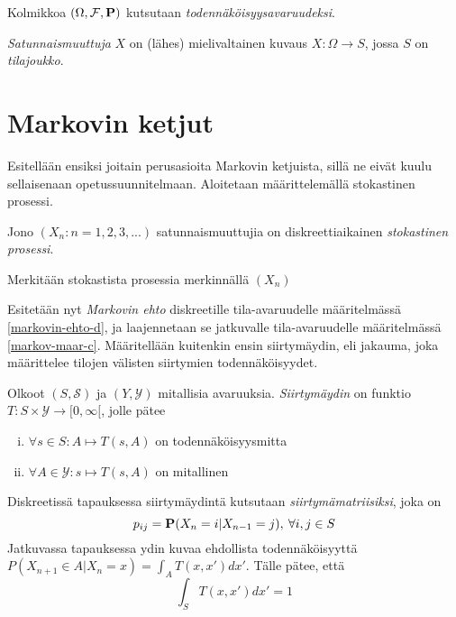\begin{maar}
	Kolmikkoa $(\Omega, \mathcal{F}, \textbf{P} )$ kutsutaan \textit{todennäköisyysavaruudeksi}.
\end{maar}

\begin{maar}
	\textit{Satunnaismuuttuja} $X$ on (lähes) mielivaltainen kuvaus $X:\Omega\rightarrow S$, jossa $S$ on \textit{tilajoukko}. 
\end{maar}



\section{Markovin ketjut}

Esitellään ensiksi joitain perusasioita Markovin ketjuista, sillä ne eivät kuulu sellaisenaan opetussuunnitelmaan. Aloitetaan määrittelemällä stokastinen prosessi.\cite{piiroinen_stokastiset_nodate}

\begin{maar}
	Jono $(X_n:n=1,2,3,...)$ satunnaismuuttujia on diskreettiaikainen \textit{stokastinen prosessi}.
\end{maar}

\begin{merk}
	Merkitään stokastista prosessia merkinnällä $( X_n )$
\end{merk}

Esitetään nyt \textit{Markovin ehto} diskreetille tila-avaruudelle määritelmässä \ref{markovin-ehto-d}, ja laajennetaan se jatkuvalle tila-avaruudelle määritelmässä \ref{markov-maar-c}. \cite{monte_carlo_book} Määritellään kuitenkin ensin siirtymäydin, eli jakauma, joka määrittelee tilojen välisten siirtymien todennäköisyydet.  \cite[s.~180]{klenke2013probability}

\begin{maar}
	Olkoot $(S,\mathcal{S})$ ja $(Y, \mathcal{Y})$ mitallisia avaruuksia. \emph{Siirtymäydin} on funktio $T:S\times \mathcal{Y} \rightarrow [0, \infty[$, jolle pätee
	\begin{enumerate}[(i)]
		\item $\forall s \in S: A \mapsto T(s,A)$ on todennäköisyysmitta
		\item $\forall A \in \mathcal{Y}: s \mapsto T(s,A)$ on mitallinen
	\end{enumerate}
	Diskreetissä tapauksessa siirtymäydintä kutsutaan \textit{siirtymämatriisiksi}, joka on 
	\begin{equation}
		p_{ij} = \textbf{P}(X_n = i | X_{n-1} = j), \:\forall i,j \in S
	\end{equation}
	Jatkuvassa tapauksessa ydin kuvaa ehdollista todennäköisyyttä $P(X_{n+1} \in A|X_n = x) = \int_A T(x,x')dx'$. Tälle pätee, että 
	\begin{equation}\label{siirt-tiheys}
		\int_S T(x,x')dx' = 1
	\end{equation}
\end{maar}

